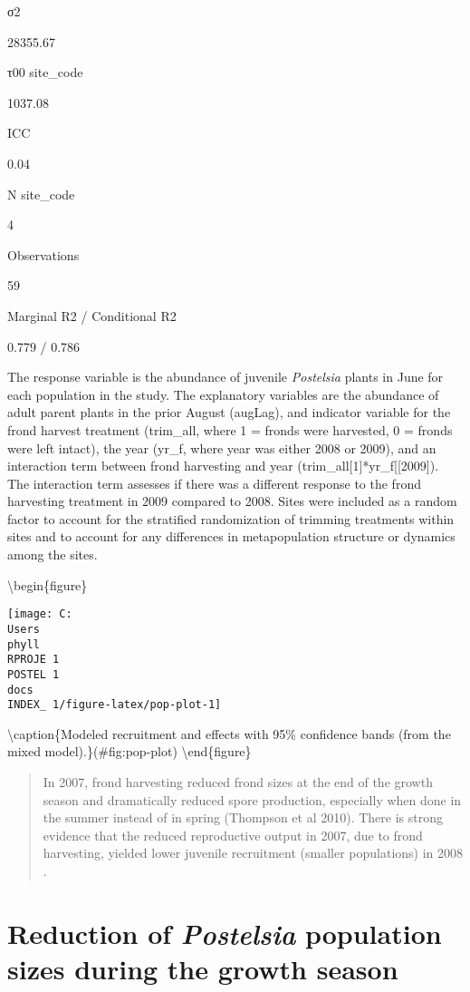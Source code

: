 \documentclass[
]{article}
\begin{document}
σ2

28355.67

τ00 site\_code

1037.08

ICC

0.04

N site\_code

4

Observations

59

Marginal R2 / Conditional R2

0.779 / 0.786

The response variable is the abundance of juvenile \emph{Postelsia} plants in June for each population in the study. The explanatory variables are the abundance of adult parent plants in the prior August (augLag), and indicator variable for the frond harvest treatment (trim\_all, where 1 = fronds were harvested, 0 = fronds were left intact), the year (yr\_f, where year was either 2008 or 2009), and an interaction term between frond harvesting and year (trim\_all{[}1{]}*yr\_f{[}{[}2009{]}). The interaction term assesses if there was a different response to the frond harvesting treatment in 2009 compared to 2008. Sites were included as a random factor to account for the stratified randomization of trimming treatments within sites and to account for any differences in metapopulation structure or dynamics among the sites.

\textbackslash begin\{figure\}

\texttt{[image: C:\\Users\\phyll\\RPROJE~1\\POSTEL~1\\docs\\INDEX\_~1/figure-latex/pop-plot-1]} \hfill{}

\textbackslash caption\{Modeled recruitment and effects with 95\% confidence bands (from the mixed model).\}(\#fig:pop-plot)
\textbackslash end\{figure\}

\begin{quote}
In 2007, frond harvesting reduced frond sizes at the end of the growth season and dramatically reduced spore production, especially when done in the summer instead of in spring (Thompson et al 2010). There is strong evidence that the reduced reproductive output in 2007, due to frond harvesting, yielded lower juvenile recruitment (smaller populations) in 2008 .
\end{quote}

\newpage

\hypertarget{reduction-of-postelsia-population-sizes-during-the-growth-season}{%
\section{\texorpdfstring{Reduction of \emph{Postelsia} population sizes during the growth season}{Reduction of Postelsia population sizes during the growth season}}\label{reduction-of-postelsia-population-sizes-during-the-growth-season}}
\end{document}
